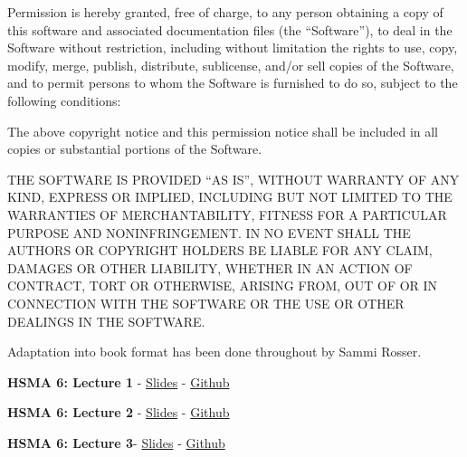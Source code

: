 \documentclass[
  letterpaper,
  DIV=11,
  numbers=noendperiod]{scrreprt}
\begin{document}
\begin{tcolorbox}[enhanced jigsaw, colframe=quarto-callout-note-color-frame, bottomtitle=1mm, breakable, rightrule=.15mm, coltitle=black, colbacktitle=quarto-callout-note-color!10!white, opacityback=0, leftrule=.75mm, arc=.35mm, toptitle=1mm, title=\textcolor{quarto-callout-note-color}{\faInfo}\hspace{0.5em}{MIT Licence of adapted code}, titlerule=0mm, colback=white, toprule=.15mm, bottomrule=.15mm, left=2mm, opacitybacktitle=0.6]

Permission is hereby granted, free of charge, to any person obtaining a
copy of this software and associated documentation files (the
``Software''), to deal in the Software without restriction, including
without limitation the rights to use, copy, modify, merge, publish,
distribute, sublicense, and/or sell copies of the Software, and to
permit persons to whom the Software is furnished to do so, subject to
the following conditions:

The above copyright notice and this permission notice shall be included
in all copies or substantial portions of the Software.

THE SOFTWARE IS PROVIDED ``AS IS'', WITHOUT WARRANTY OF ANY KIND,
EXPRESS OR IMPLIED, INCLUDING BUT NOT LIMITED TO THE WARRANTIES OF
MERCHANTABILITY, FITNESS FOR A PARTICULAR PURPOSE AND NONINFRINGEMENT.
IN NO EVENT SHALL THE AUTHORS OR COPYRIGHT HOLDERS BE LIABLE FOR ANY
CLAIM, DAMAGES OR OTHER LIABILITY, WHETHER IN AN ACTION OF CONTRACT,
TORT OR OTHERWISE, ARISING FROM, OUT OF OR IN CONNECTION WITH THE
SOFTWARE OR THE USE OR OTHER DEALINGS IN THE SOFTWARE.

\end{tcolorbox}

Adaptation into book format has been done throughout by Sammi Rosser.

\textbf{HSMA 6: Lecture 1} -
\href{https://docs.google.com/presentation/d/1HO0wXTocHRZgeuLadkGvqf5yC8BEmQzTcgo8QHOd0yY/edit?usp=sharing}{Slides}
- \href{https://github.com/hsma-programme/h6_2a_intro_to_des}{Github}

\textbf{HSMA 6: Lecture 2} -
\href{https://docs.google.com/presentation/d/15bQX0yxfDgjNVJSQORNzBCWVvbKI_LaTcbtYVKsvYcU/edit?usp=sharing}{Slides}
- \href{https://github.com/hsma-programme/h6_simpy_part_1}{Github}

\textbf{HSMA 6: Lecture 3}-
\href{https://docs.google.com/presentation/d/1y7S7bjJtdLQCquzzZ2vjYzRx9-RwXE-SWgWf88fLc4o/edit?usp=sharing}{Slides}
- \href{https://github.com/hsma-programme/h6_simpy_part_2}{Github}
\end{document}
